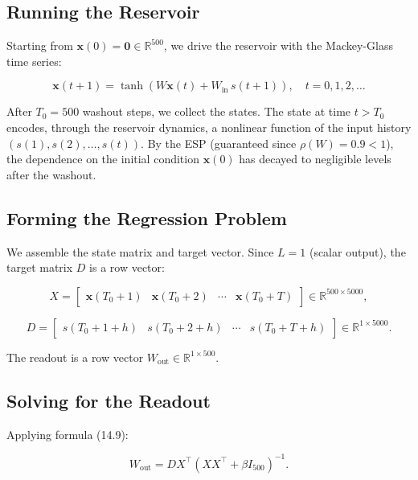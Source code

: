 \subsection{Running the Reservoir}\label{sec:14.6.3}

Starting from $\mathbf{x}(0) = \mathbf{0} \in \mathbb{R}^{500}$, we drive the reservoir with the Mackey-Glass time series:

\begin{equation}\label{eq:14.11}\tag{14.11}
\mathbf{x}(t+1) = \tanh\!\left(W\mathbf{x}(t) + W_{\text{in}}\, s(t+1)\right), \quad t = 0, 1, 2, \ldots
\end{equation}

After $T_0 = 500$ washout steps, we collect the states. The state at time $t > T_0$ encodes, through the reservoir dynamics, a nonlinear function of the input history $(s(1), s(2), \ldots, s(t))$. By the ESP (guaranteed since $\rho(W) = 0.9 < 1$), the dependence on the initial condition $\mathbf{x}(0)$ has decayed to negligible levels after the washout.

\subsection{Forming the Regression Problem}\label{sec:14.6.4}

We assemble the state matrix and target vector. Since $L = 1$ (scalar output), the target matrix $D$ is a row vector:

\[
X = \begin{bmatrix} \mathbf{x}(T_0+1) & \mathbf{x}(T_0+2) & \cdots & \mathbf{x}(T_0+T) \end{bmatrix} \in \mathbb{R}^{500 \times 5000},
\]

\[
D = \begin{bmatrix} s(T_0+1+h) & s(T_0+2+h) & \cdots & s(T_0+T+h) \end{bmatrix} \in \mathbb{R}^{1 \times 5000}.
\]

The readout is a row vector $W_{\text{out}} \in \mathbb{R}^{1 \times 500}$.

\subsection{Solving for the Readout}\label{sec:14.6.5}

Applying formula (14.9):

\begin{equation}\label{eq:14.12}\tag{14.12}
W_{\text{out}} = D X^\top (X X^\top + \beta I_{500})^{-1}.
\end{equation}


